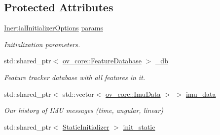 \subsection*{Protected Attributes}
\begin{DoxyCompactItemize}
\item 
\mbox{\label{classov__init_1_1InertialInitializer_aa2a83ab908985ccb9f89dd6613fb203c}} 
\hyperlink{structov__init_1_1InertialInitializerOptions}{Inertial\+Initializer\+Options} \hyperlink{classov__init_1_1InertialInitializer_aa2a83ab908985ccb9f89dd6613fb203c}{params}
\begin{DoxyCompactList}\small\item\em Initialization parameters. \end{DoxyCompactList}\item 
\mbox{\label{classov__init_1_1InertialInitializer_a3968041a4da5cf43774845bd1782707d}} 
std\+::shared\+\_\+ptr$<$ \hyperlink{classov__core_1_1FeatureDatabase}{ov\+\_\+core\+::\+Feature\+Database} $>$ \hyperlink{classov__init_1_1InertialInitializer_a3968041a4da5cf43774845bd1782707d}{\+\_\+db}
\begin{DoxyCompactList}\small\item\em Feature tracker database with all features in it. \end{DoxyCompactList}\item 
\mbox{\label{classov__init_1_1InertialInitializer_a41bba4e8e0bb529ca90bd80a0cbe77d4}} 
std\+::shared\+\_\+ptr$<$ std\+::vector$<$ \hyperlink{structov__core_1_1ImuData}{ov\+\_\+core\+::\+Imu\+Data} $>$ $>$ \hyperlink{classov__init_1_1InertialInitializer_a41bba4e8e0bb529ca90bd80a0cbe77d4}{imu\+\_\+data}
\begin{DoxyCompactList}\small\item\em Our history of I\+MU messages (time, angular, linear) \end{DoxyCompactList}\item 
\mbox{\label{classov__init_1_1InertialInitializer_a89f3e90f16c4c42407696a11701f6db3}} 
std\+::shared\+\_\+ptr$<$ \hyperlink{classov__init_1_1StaticInitializer}{Static\+Initializer} $>$ \hyperlink{classov__init_1_1InertialInitializer_a89f3e90f16c4c42407696a11701f6db3}{init\+\_\+static}

\end{DoxyCompactItemize}
